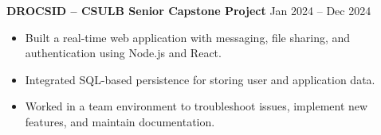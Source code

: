 \documentclass[a4paper,9.5pt]{article}
\newcommand{\dateright}[1]{\hfill {\small\textnormal{#1}}}
\begin{document}
\textbf{DROCSID – CSULB Senior Capstone Project} \dateright{Jan 2024 – Dec 2024}
\begin{itemize}
  \item Built a real-time web application with messaging, file sharing, and authentication using Node.js and React.
  \item Integrated SQL-based persistence for storing user and application data.
  \item Worked in a team environment to troubleshoot issues, implement new features, and maintain documentation.
\end{itemize}

\end{document}
